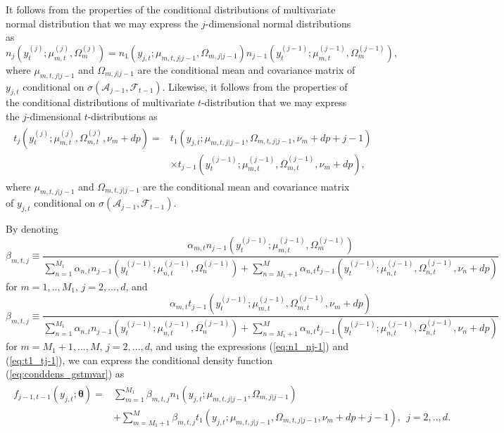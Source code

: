 \documentclass[nojss]{jss}
\begin{document}
\begin{appendix}
It follows from the properties of the conditional distributions of multivariate normal distribution that we may express the $j$-dimensional normal distributions as
\begin{equation}\label{eq:n1_nj-1}
n_j(y_{t}^{(j)};\mu_{m,t}^{(j)},\Omega_m^{(j)}) = n_1(y_{j,t};\mu_{m,t,j|j-1},\Omega_{m,j|j-1}) n_{j-1}(y_{t}^{(j-1)};\mu_{m,t}^{(j-1)},\Omega_m^{(j-1)}),
\end{equation}
where $\mu_{m,t,j|j-1}$ and $\Omega_{m,j|j-1}$ are the conditional mean and covariance matrix of $y_{j,t}$ conditional on $\sigma(\mathcal{A}_{j-1},\mathcal{F}_{t-1})$.  Likewise, it follows from the properties of the conditional distributions of multivariate $t$-distribution that we may express the $j$-dimensional $t$-distributions as
\begin{align}\label{eq:t1_tj-1}
\begin{aligned}
t_j(y_{t}^{(j)};\mu_{m,t}^{(j)},\Omega_{m,t}^{(j)},\nu_m + dp) =& t_1(y_{j,t};\mu_{m,t,j|j-1},\Omega_{m,t,j|j-1},\nu_m + dp + j  - 1) \\
&\times t_{j-1}(y_{t}^{(j-1)};\mu_{m,t}^{(j-1)},\Omega_{m,t}^{(j-1)},\nu_m + dp),
\end{aligned}
\end{align}
where $\mu_{m,t,j|j-1}$ and $\Omega_{m,t,j|j-1}$ are the conditional mean and covariance matrix of $y_{j,t}$ conditional on $\sigma(\mathcal{A}_{j-1},\mathcal{F}_{t-1})$.

By denoting
\begin{equation}\label{eq:beta_mtj_t1}
\beta_{m,t,j} \equiv \frac{\alpha_{m,t}n_{j-1}(y_{t}^{(j-1)};\mu_{m,t}^{(j-1)},\Omega_{m}^{(j-1)})}{\sum_{n=1}^{M_1}\alpha_{n,t} n_{j-1}(y_{t}^{(j-1)};\mu_{n,t}^{(j-1)},\Omega_{n}^{(j-1)}) +\sum_{n=M_1+1}^{M}\alpha_{n,t} t_{j-1}(y_{t}^{(j-1)};\mu_{n,t}^{(j-1)},\Omega_{n,t}^{(j-1)},\nu_n + dp)}
\end{equation}
for $m=1,..,M_1$,  $j=2,...,d$,  and
\begin{equation}\label{eq:beta_mtj_t2}
\beta_{m,t,j} \equiv \frac{\alpha_{m,t}t_{j-1}(y_{t}^{(j-1)};\mu_{m,t}^{(j-1)},\Omega_{m,t}^{(j-1)},\nu_m + dp)}{\sum_{n=1}^{M_1}\alpha_{n,t} n_{j-1}(y_{t}^{(j-1)};\mu_{n,t}^{(j-1)},\Omega_{n}^{(j-1)}) +\sum_{n=M_1+1}^{M}\alpha_{n,t} t_{j-1}(y_{t}^{(j-1)};\mu_{n,t}^{(j-1)},\Omega_{n,t}^{(j-1)},\nu_n + dp)}
\end{equation}
for $m=M_1+1,...,M$,  $j=2,...,d$, and using the expressions (\ref{eq:n1_nj-1}) and (\ref{eq:t1_tj-1}),  we can express the conditional density function (\ref{eq:conddens_gstmvar}) as
\begin{align}
\begin{aligned}
f_{j-1,t-1}\left(y_{j,t};\boldsymbol{\theta}\right)=&\sum_{m=1}^{M_1}\beta_{m,t,j}n_1(y_{j,t};\mu_{m,t,j|j-1},\Omega_{m,j|j-1})\\
& + \sum_{m=M_1+1}^{M}\beta_{m,t,j}t_1(y_{j,t};\mu_{m,t,j|j-1},\Omega_{m,t,j|j-1},\nu_m + dp + j - 1), \ \ j=2,..,d.
\end{aligned}
\end{align}


\end{appendix}
\end{document}
